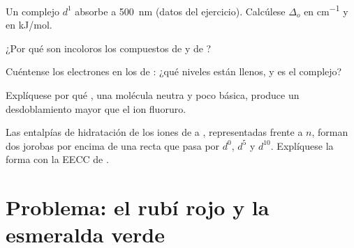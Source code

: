 \begin{exercise}[$\star\star$]\label{exo:b2:ligand-field:8}
Un complejo $d^1$ absorbe a \qty{500}{nm} (datos del ejercicio). Calcúlese $\Delta_o$ en \unit{cm^{-1}} y en
\unit{kJ/mol}.
\end{exercise}

\begin{exercise}[$\star\star$]\label{exo:b2:ligand-field:9}
¿Por qué son incoloros los compuestos de  y de ?
\end{exercise}

\begin{exercise}[$\star\star\star$]\label{exo:b2:ligand-field:10}
Cuéntense los electrones en los  de : ¿qué niveles están llenos,
y es  el complejo?
\end{exercise}

\begin{exercise}[$\star\star\star$]\label{exo:b2:ligand-field:11}
Explíquese por qué , una molécula neutra y poco básica, produce un desdoblamiento mayor que
el ion fluoruro.
\end{exercise}

\begin{exercise}[$\star\star\star$]\label{exo:b2:ligand-field:12}
Las entalpías de hidratación de los iones  de  a , representadas frente a $n$, forman
dos jorobas por encima de una recta que pasa por $d^0$, $d^5$ y $d^{10}$. Explíquese la forma con la
EECC de .
\end{exercise}

\section{Problema: el rubí rojo y la esmeralda verde}

